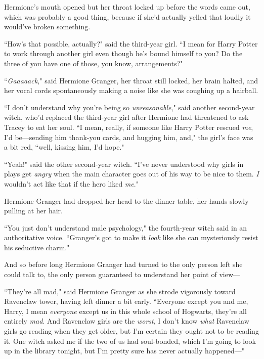 Hermione's mouth opened but her throat locked up before the words came out, which was probably a good thing, because if she'd actually yelled that loudly it would've broken something.

``How's that possible, actually?" said the third-year girl. ``I mean for Harry Potter to work through another girl even though he's bound himself to you? Do the three of you have one of those, you know, arrangements?"

``\emph{Gaaaaack,}" said Hermione Granger, her throat still locked, her brain halted, and her vocal cords spontaneously making a noise like she was coughing up a hairball.


``I don't understand why you're being so \emph{unreasonable}," said another second-year witch, who'd replaced the third-year girl after Hermione had threatened to ask Tracey to eat her soul. ``I mean, really, if someone like Harry Potter rescued \emph{me}, I'd be—sending him thank-you cards, and hugging him, and," the girl's face was a bit red, ``well, kissing him, I'd hope."

``Yeah!" said the other second-year witch. ``I've never understood why girls in plays get \emph{angry} when the main character goes out of his way to be nice to them. \emph{I} wouldn't act like that if the hero liked \emph{me}."

Hermione Granger had dropped her head to the dinner table, her hands slowly pulling at her hair.

``You just don't understand male psychology," the fourth-year witch said in an authoritative voice. ``Granger's got to make it \emph{look} like she can mysteriously resist his seductive charm."


And so before long Hermione Granger had turned to the only person left she could talk to, the only person guaranteed to understand her point of view—

``They're all mad," said Hermione Granger as she strode vigorously toward Ravenclaw tower, having left dinner a bit early. ``Everyone except you and me, Harry, I mean \emph{everyone} except us in this whole school of Hogwarts, they're all entirely \emph{mad}. And Ravenclaw girls are the \emph{worst}, I don't know \emph{what} Ravenclaw girls go reading when they get older, but I'm certain they ought not to be reading it. One witch asked me if the two of us had soul-bonded, which I'm going to look up in the library tonight, but I'm pretty sure has never actually happened—"

